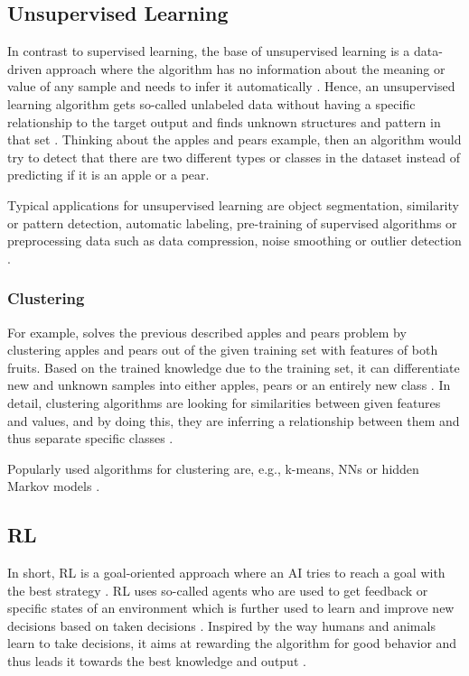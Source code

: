 \documentclass[MGS,Master,english]{twbook}%
\begin{document}
\subsection{Unsupervised Learning} \label{ML::unsupervisedLearning}
In contrast to supervised learning, the base of unsupervised learning is a data-driven approach where the algorithm has no information about the meaning or value of any sample and needs to infer it automatically \cite{ml::book::developer}. Hence, an unsupervised learning algorithm gets so-called unlabeled data without having a specific relationship to the target output and finds unknown structures and pattern in that set \cite{ai::book}. Thinking about the apples and pears example, then an algorithm would try to detect that there are two different types or classes in the dataset instead of predicting if it is an apple or a pear.

Typical applications for unsupervised learning are object segmentation, similarity or pattern detection, automatic labeling, pre-training of supervised algorithms or preprocessing data such as data compression, noise smoothing or outlier detection \cite{ml::book::algorithms} \cite{ai::book}.

\subsubsection{Clustering}
For example, solves the previous described apples and pears problem by clustering apples and pears out of the given training set with features of both fruits. Based on the trained knowledge due to the training set, it can differentiate new and unknown samples into either apples, pears or an entirely new class \cite{ai::book}. In detail, clustering algorithms are looking for similarities between given features and values, and by doing this, they are inferring a relationship between them and thus separate specific classes \cite{ml::book::developer}.

Popularly used algorithms for clustering are, e.g., k-means, \acp{NN} or hidden Markov models \cite{ml::book::developer}.

\subsection{\acl{RL}}
In short, \ac{RL} is a goal-oriented approach where an \ac{AI} tries to reach a goal with the best strategy \cite{ml::book::developer}. \ac{RL} uses so-called agents who are used to get feedback or specific states of an environment which is further used to learn and improve new decisions based on taken decisions \cite{ml::book::developer}. Inspired by the way humans and animals learn to take decisions, it aims at rewarding the algorithm for good behavior and thus leads it towards the best knowledge and output \cite{ai::book}. 
\end{document}
